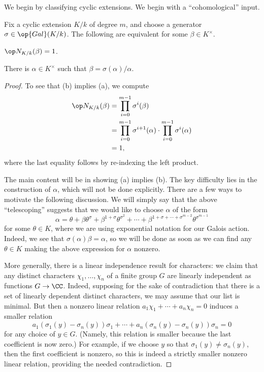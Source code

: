 \documentclass[../notes.tex]{subfiles}
\begin{document}
We begin by classifying cyclic extensions. We begin with a ``cohomological'' input.
\begin{proposition} \label{prop:hilbert-90}
	Fix a cyclic extension $K/k$ of degree $m$, and choose a generator $\sigma\in\op{Gal}(K/k)$. The following are equivalent for some $\beta\in K^\times$.
	\begin{listalph}
		\item $\op N_{K/k}(\beta)=1$.
		\item There is $\alpha\in K^\times$ such that $\beta=\sigma(\alpha)/\alpha$.
	\end{listalph}
\end{proposition}
\begin{proof}
	To see that (b) implies (a), we compute
	\begin{align*}
		\op N_{K/k}(\beta) &= \prod_{i=0}^{m-1}\sigma^i(\beta) \\
		&= \prod_{i=0}^{m-1}\sigma^{i+1}(\alpha)\cdot\prod_{i=0}^{m-1}\sigma^i(\alpha) \\
		&= 1,
	\end{align*}
	where the last equality follows by re-indexing the left product.

	The main content will be in showing (a) implies (b). The key difficulty lies in the construction of $\alpha$, which will not be done explicitly. There are a few ways to motivate the following discussion. We will simply say that the above ``telescoping'' suggests that we would like to choose $\alpha$ of the form
	\[\alpha=\theta+\beta\theta^\sigma+\beta^{1+\sigma}\theta^{\sigma^2}+\cdots+\beta^{1+\sigma+\cdots+\sigma^{m-2}}\theta^{\sigma^{m-1}}\]
	for some $\theta\in K$, where we are using exponential notation for our Galois action. Indeed, we see that $\sigma(\alpha)\beta=\alpha$, so we will be done as soon as we can find any $\theta\in K$ making the above expression for $\alpha$ nonzero.

	More generally, there is a linear independence result for characters: we claim that any distinct characters $\chi_1,\ldots,\chi_n$ of a finite group $G$ are linearly independent as functions $G\to\CC$. Indeed, supposing for the sake of contradiction that there is a set of linearly dependent distinct characters, we may assume that our list is minimal. But then a nonzero linear relation $a_1\chi_1+\cdots+a_n\chi_n=0$ induces a smaller relation
	\[a_1(\sigma_1(y)-\sigma_n(y))\sigma_1+\cdots+a_n(\sigma_n(y)-\sigma_n(y))\sigma_n=0\]
	for any choice of $y\in G$. (Namely, this relation is smaller because the last coefficient is now zero.) For example, if we choose $y$ so that $\sigma_1(y)\ne\sigma_n(y)$, then the first coefficient is nonzero, so this is indeed a strictly smaller nonzero linear relation, providing the needed contradiction.
\end{proof}
\end{document}
